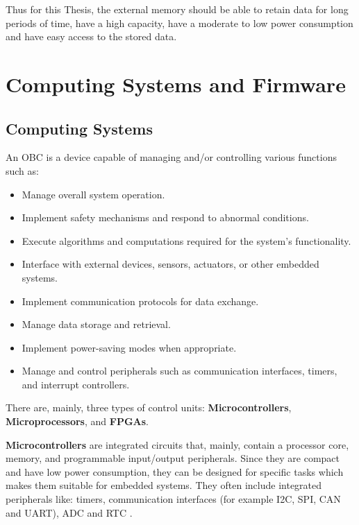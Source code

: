 Thus for this Thesis, the external memory should be able to retain data for long periods of time, have a high capacity, have a moderate to low power consumption and have easy access to the stored data.


\section{Computing Systems and Firmware}

\subsection{Computing Systems}
An \gls{OBC} is a device capable of managing and/or controlling various functions such as:
\begin{itemize}
    \item Manage overall system operation.
    \item Implement safety mechanisms and respond to abnormal conditions.
    \item Execute algorithms and computations required for the system's functionality.
    \item Interface with external devices, sensors, actuators, or other embedded systems.
    \item Implement communication protocols for data exchange.
    \item Manage data storage and retrieval.
    \item Implement power-saving modes when appropriate.
    \item Manage and control peripherals such as communication interfaces, timers, and interrupt controllers.
\end{itemize}

There are, mainly, three types of control units: \textbf{Microcontrollers}, \textbf{Microprocessors}, and \textbf{\glspl{FPGA}}.

\textbf{Microcontrollers} are integrated circuits that, mainly, contain a processor core, memory, and programmable input/output peripherals.
Since they are compact and have low power consumption, they can be designed for specific tasks which makes them suitable for embedded systems.
They often include integrated peripherals like: timers, communication interfaces (for example \gls{I2C}, \gls{SPI}, \gls{CAN} and \gls{UART}), \gls{ADC} and \gls{RTC} \cite{OBC1}.


